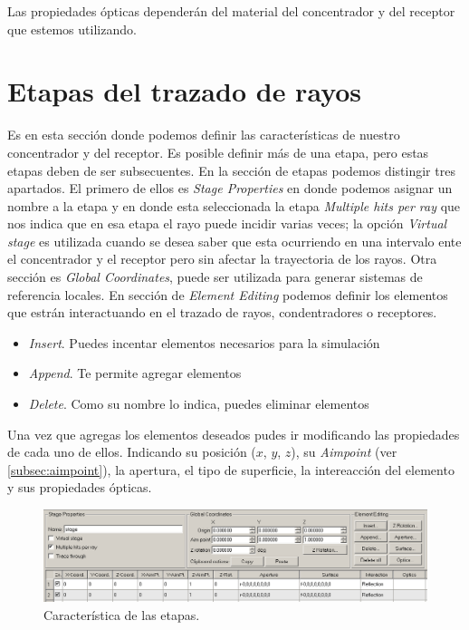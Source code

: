 \documentclass[12pt, spanish]{article}
\theoremstyle{problemstyle}
\begin{document}
Las propiedades ópticas dependerán del material del concentrador y del receptor que estemos utilizando.

\section{Etapas del trazado de rayos}
\label{sec:etapas}

Es en esta sección donde podemos definir las características de nuestro concentrador y del receptor. Es posible definir más de una etapa, pero estas etapas deben de ser subsecuentes. En la sección de etapas podemos distingir tres apartados. El primero de ellos es \emph{Stage Properties} en donde podemos asignar un nombre a la etapa y en donde esta seleccionada la etapa \emph{Multiple hits per ray} que nos indica que en esa etapa el rayo puede incidir varias veces; la opción \emph{Virtual stage} es utilizada cuando se desea saber que esta ocurriendo en una intervalo ente el concentrador y el receptor pero sin afectar la trayectoria de los rayos. Otra sección es \emph{Global Coordinates}, puede ser utilizada para generar sistemas de referencia locales. En sección de \emph{Element Editing} podemos definir los elementos que estrán interactuando en el trazado de rayos, condentradores o receptores.

\begin{itemize}[noitemsep]
\item \emph{Insert}. Puedes incentar elementos necesarios para la simulación
\item \emph{Append}. Te permite agregar elementos
\item \emph{Delete}. Como su nombre lo indica, puedes eliminar elementos
\end{itemize}

Una vez que agregas los elementos deseados pudes ir modificando las propiedades de cada uno de ellos. Indicando su posición ($x$, $y$, $z$), su \emph{Aimpoint} (ver \ref{subsec:aimpoint}), la apertura, el tipo de superficie, la intereacción del elemento y sus propiedades ópticas.

\begin{figure}[h!]
  \centering
  \includegraphics[width=1.0\textwidth]{figures/stage}
  \caption{\label{fig:etapa} Característica de las etapas.}
\end{figure}
\end{document}
